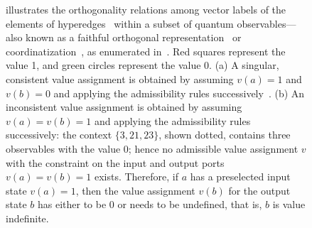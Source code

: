\documentclass[%
 superscriptaddress,
  preprint,
 showpacs,
 showkeys,
 nofootinbib,
  amsmath,amssymb,
  aps,
 pra,
  longbibliography,
  floatfix,
 ]{revtex4-2}
\theoremstyle{definition}
\begin{document}
\begin{figure}
{illustrates the orthogonality relations among vector labels of the elements of hyperedges~\cite{lovasz-79} within a subset of quantum observables---also known as a faithful orthogonal representation~\cite{Portillo-2015} or coordinatization~\cite{Pavii2018}, as enumerated in~\cite[Table~I]{2018-minimalYIYS}. Red squares represent the value 1, and green circles represent the value 0.
(a) A singular, consistent value assignment is obtained by assuming $v(a)=1$ and $v(b)=0$ and applying the admissibility rules successively~\cite[Figure~(24.2.a)]{Svozil-2018-p}.
(b) An inconsistent value assignment is obtained by assuming $v(a)=v(b)=1$ and applying the admissibility rules successively:
 the context $\{3,21,23\}$, shown dotted, contains three observables with the value 0; hence no admissible value assignment $v$
with the constraint on the input and output ports $v(a)=v(b)=1$ exists. Therefore, if $a$ has a preselected input state $v(a)=1$,
then the value assignment $v(b)$ for the output state $b$ has either to be 0 or needs to be undefined, that is, $b$ is value indefinite.
}
                \label{2023-viext-TIFS}
        \end{figure}






\end{document}
